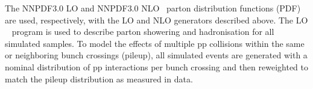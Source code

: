 
The \textsc{NNPDF}3.0 LO and \textsc{NNPDF}3.0 NLO~\cite{nnpdf} parton
distribution functions (PDF) are used, respectively, with the LO and
NLO generators described above. The LO ~\cite{pythia}
program is used to describe parton showering and hadronisation for all
simulated samples. To model the effects of multiple pp collisions
within the same or neighboring bunch crossings (pileup), all simulated
events are generated with a nominal distribution of pp interactions
per bunch crossing and then reweighted to match the pileup
distribution as measured in data. 



